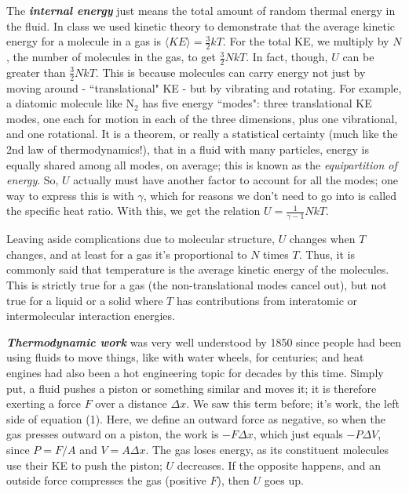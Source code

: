 \documentclass[12pt]{article}
\begin{document}
The \textit{\textbf{internal energy}} just means the total amount of random thermal energy in the fluid. In class we used kinetic theory to demonstrate that the average kinetic energy for a molecule in a gas is $\langle KE \rangle = \frac{3}{2}kT$. For the total KE, we multiply by $N$, the number of molecules in the gas, to get $\frac{3}{2}NkT$. In fact, though, $U$ can be greater than $\frac{3}{2}NkT$. This is because molecules can carry energy not just by moving around - ``translational" KE - but by vibrating and rotating. For example, a diatomic molecule like N$_2$ has five energy ``modes": three translational KE modes, one each for motion in each of the three dimensions, plus one vibrational, and one rotational. It is a theorem, or really a statistical certainty (much like the 2nd law of thermodynamics!), that in a fluid with many particles, energy is equally shared among all modes, on average; this is known as the \textit{equipartition of energy}. So, $U$ actually must have another factor to account for all the modes; one way to express this is with $\gamma$, which for reasons we don't need to go into is called the specific heat ratio. With this, we get the relation $U=\frac{1}{\gamma-1}NkT$.  

Leaving aside complications due to molecular structure, $U$ changes when $T$ changes, and at least for a gas it's proportional to $N$ times $T$. Thus, it is commonly said that temperature is the average kinetic energy of the molecules. This is strictly true for a gas (the non-translational modes cancel out), but not true for a liquid or a solid where $T$ has contributions from interatomic or intermolecular interaction energies.

\textit{\textbf{Thermodynamic work}} was very well understood by 1850 since people had been using fluids to move things, like with water wheels, for centuries; and heat engines had also been a hot engineering topic for decades by this time. Simply put, a fluid pushes a piston or something similar and moves it; it is therefore exerting a force $F$ over a distance $\Delta x$. We saw this term before; it's work, the left side of equation (1). Here, we define an outward force as negative, so when the gas presses outward on a piston, the work is $-F\Delta x$, which just equals $-P \Delta V$, since $P=F/A$ and $V=A\Delta x$. The gas loses energy, as its constituent molecules use their KE to push the piston; $U$ decreases. If the opposite happens, and an outside force compresses the gas (positive $F$), then $U$ goes up.   
\end{document}
